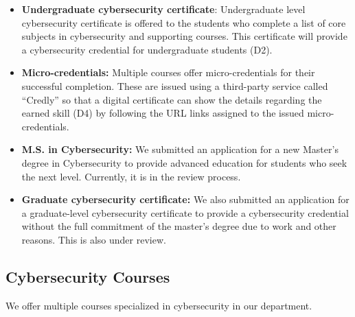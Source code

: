 \documentclass{article}
\begin{document}
\begin{itemize}
    \item \textbf{Undergraduate cybersecurity certificate}: Undergraduate level cybersecurity certificate is offered to the students who complete a list of core subjects in cybersecurity and supporting courses. This certificate will provide a cybersecurity credential for undergraduate students (D2).



\item \textbf{Micro-credentials:} Multiple courses offer micro-credentials for their successful completion. These are issued using a third-party service called ``Credly'' so that a digital certificate can show the details regarding the earned skill (D4) by following the URL links assigned to the issued micro-credentials.

\item \textbf{M.S. in Cybersecurity:} We submitted an application for a new Master's degree in Cybersecurity to provide advanced education for students who seek the next level. Currently, it is in the review process.

\item \textbf{Graduate cybersecurity certificate:}
We also submitted an application for a graduate-level cybersecurity certificate to provide a cybersecurity credential without the full commitment of the master's degree due to work and other reasons. This is also under review.



\end{itemize}




\subsection{Cybersecurity Courses}

We offer multiple courses specialized in cybersecurity in our department.
\end{document}
